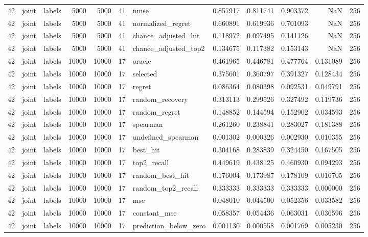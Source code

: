 \begin{tabular}{rllrrrlrrrrr}
42 & joint & labels & 5000 & 5000 & 41 & nmse & 0.857917 & 0.811741 & 0.903372 & NaN & 256 \\
42 & joint & labels & 5000 & 5000 & 41 & normalized_regret & 0.660891 & 0.619936 & 0.701093 & NaN & 256 \\
42 & joint & labels & 5000 & 5000 & 41 & chance_adjusted_hit & 0.118972 & 0.097495 & 0.141126 & NaN & 256 \\
42 & joint & labels & 5000 & 5000 & 41 & chance_adjusted_top2 & 0.134675 & 0.117382 & 0.153143 & NaN & 256 \\
42 & joint & labels & 10000 & 10000 & 17 & oracle & 0.461965 & 0.446781 & 0.477764 & 0.131089 & 256 \\
42 & joint & labels & 10000 & 10000 & 17 & selected & 0.375601 & 0.360797 & 0.391327 & 0.128434 & 256 \\
42 & joint & labels & 10000 & 10000 & 17 & regret & 0.086364 & 0.080398 & 0.092531 & 0.049791 & 256 \\
42 & joint & labels & 10000 & 10000 & 17 & random_recovery & 0.313113 & 0.299526 & 0.327492 & 0.119736 & 256 \\
42 & joint & labels & 10000 & 10000 & 17 & random_regret & 0.148852 & 0.144594 & 0.152902 & 0.034593 & 256 \\
42 & joint & labels & 10000 & 10000 & 17 & spearman & 0.261260 & 0.238841 & 0.283027 & 0.181388 & 256 \\
42 & joint & labels & 10000 & 10000 & 17 & undefined_spearman & 0.001302 & 0.000326 & 0.002930 & 0.010355 & 256 \\
42 & joint & labels & 10000 & 10000 & 17 & best_hit & 0.304168 & 0.283839 & 0.324450 & 0.167505 & 256 \\
42 & joint & labels & 10000 & 10000 & 17 & top2_recall & 0.449619 & 0.438125 & 0.460930 & 0.094293 & 256 \\
42 & joint & labels & 10000 & 10000 & 17 & random_best_hit & 0.176004 & 0.173987 & 0.178109 & 0.016705 & 256 \\
42 & joint & labels & 10000 & 10000 & 17 & random_top2_recall & 0.333333 & 0.333333 & 0.333333 & 0.000000 & 256 \\
42 & joint & labels & 10000 & 10000 & 17 & mse & 0.048010 & 0.044500 & 0.052356 & 0.033582 & 256 \\
42 & joint & labels & 10000 & 10000 & 17 & constant_mse & 0.058357 & 0.054436 & 0.063031 & 0.036596 & 256 \\
42 & joint & labels & 10000 & 10000 & 17 & prediction_below_zero & 0.001130 & 0.000558 & 0.001769 & 0.005230 & 256 \\

\end{tabular}
